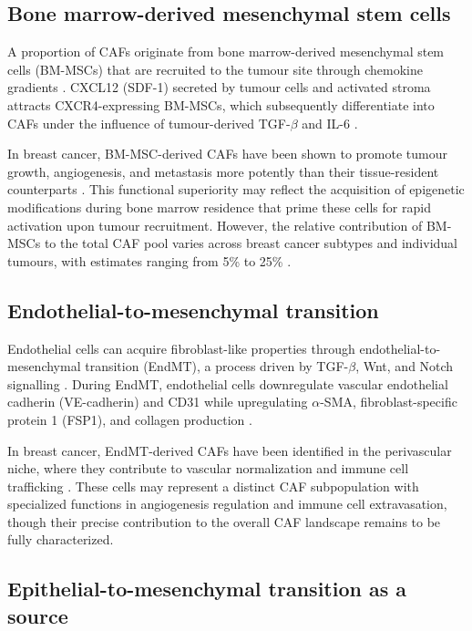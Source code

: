 \subsection{Bone marrow-derived mesenchymal stem cells}

A proportion of CAFs originate from bone marrow-derived mesenchymal stem cells (BM-MSCs) that are recruited to the tumour site through chemokine gradients \citep{spaeth2009inflammation}. CXCL12 (SDF-1) secreted by tumour cells and activated stroma attracts CXCR4-expressing BM-MSCs, which subsequently differentiate into CAFs under the influence of tumour-derived TGF-$\beta$ and IL-6 \citep{karnoub2007mesenchymal}.

In breast cancer, BM-MSC-derived CAFs have been shown to promote tumour growth, angiogenesis, and metastasis more potently than their tissue-resident counterparts \citep{quante2011bone}. This functional superiority may reflect the acquisition of epigenetic modifications during bone marrow residence that prime these cells for rapid activation upon tumour recruitment. However, the relative contribution of BM-MSCs to the total CAF pool varies across breast cancer subtypes and individual tumours, with estimates ranging from 5\% to 25\% \citep{augello2005bone}.

\subsection{Endothelial-to-mesenchymal transition}

Endothelial cells can acquire fibroblast-like properties through endothelial-to-mesenchymal transition (EndMT), a process driven by TGF-$\beta$, Wnt, and Notch signalling \citep{zeisberg2007endothelial}. During EndMT, endothelial cells downregulate vascular endothelial cadherin (VE-cadherin) and CD31 while upregulating $\alpha$-SMA, fibroblast-specific protein 1 (FSP1), and collagen production \citep{potenta2008origins}.

In breast cancer, EndMT-derived CAFs have been identified in the perivascular niche, where they contribute to vascular normalization and immune cell trafficking \citep{gasparri1999thrombospondin}. These cells may represent a distinct CAF subpopulation with specialized functions in angiogenesis regulation and immune cell extravasation, though their precise contribution to the overall CAF landscape remains to be fully characterized.

\subsection{Epithelial-to-mesenchymal transition as a source}

